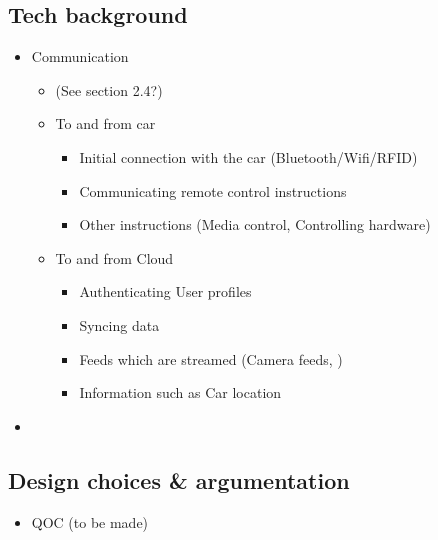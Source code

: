 \documentclass{article}
\begin{document}
\begin{itemize}
\subsection{Tech background}
	\begin{itemize}
		\item Communication
        \begin{itemize}
        	\item (See section 2.4?)
        	\item To and from car
            \begin{itemize}
            	\item Initial connection with the car (Bluetooth/Wifi/RFID)
                \item Communicating remote control instructions
                \item Other instructions (Media control, Controlling hardware)
            \end{itemize}
            \item To and from Cloud
            \begin{itemize}
            	\item Authenticating User profiles
                \item Syncing data
                \item Feeds which are streamed (Camera feeds, )
                \item Information such as Car location
            \end{itemize}
        \end{itemize}
        \item 
	\end{itemize}
    
\subsection{Design choices \& argumentation}
  \begin{itemize}
    \item QOC (to be made)
  \end{itemize}

\end{itemize}
\end{document}
